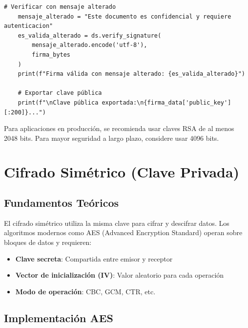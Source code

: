 \documentclass[12pt,a4paper]{article}
\begin{document}
\begin{lstlisting}[caption=Implementación de firma digital con RSA]
    # Verificar con mensaje alterado
    mensaje_alterado = "Este documento es confidencial y requiere autenticacion"
    es_valida_alterado = ds.verify_signature(
        mensaje_alterado.encode('utf-8'), 
        firma_bytes
    )
    print(f"Firma válida con mensaje alterado: {es_valida_alterado}")
    
    # Exportar clave pública
    print(f"\nClave pública exportada:\n{firma_data['public_key'][:200]}...")
\end{lstlisting}

\begin{securitygoodpractice}
    Para aplicaciones en producción, se recomienda usar claves RSA de al menos 2048 bits. Para mayor seguridad a largo plazo, considere usar 4096 bits.
\end{securitygoodpractice}

\newpage

\section{Cifrado Simétrico (Clave Privada)}

\subsection{Fundamentos Teóricos}

El cifrado simétrico utiliza la misma clave para cifrar y descifrar datos. Los
algoritmos modernos como AES (Advanced Encryption Standard) operan sobre
bloques de datos y requieren:

\begin{itemize}
    \item \textbf{Clave secreta}: Compartida entre emisor y receptor
    \item \textbf{Vector de inicialización (IV)}: Valor aleatorio para cada operación
    \item \textbf{Modo de operación}: CBC, GCM, CTR, etc.
\end{itemize}

\subsection{Implementación AES}
\end{document}
